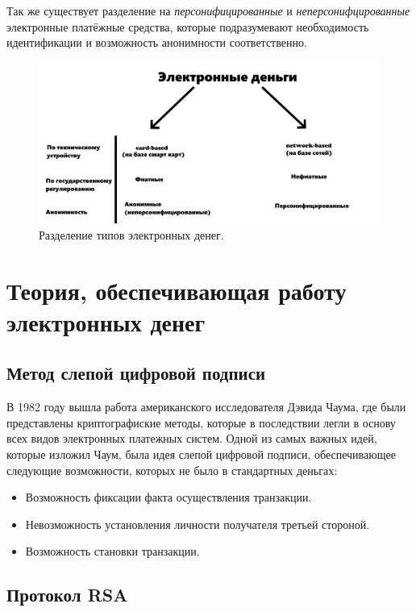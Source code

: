 \documentclass[12pt,a4paper]{article}
\begin{document}
Так же существует разделение на \textit{персонифицированные} и \textit{неперсонифцированные} электронные платёжные средства, которые подразумевают необходимость идентификации и возможность анонимности соответственно.

\begin{figure}[h]
    \centering
    \includegraphics[width=1\textwidth]{pic1}
    \caption{Разделение типов электронных денег.}
    \label{fig:mesh1}
\end{figure}

\section{Теория, обеспечивающая работу электронных денег}

\subsection{Метод слепой цифровой подписи}

В 1982 году вышла работа американского исследователя Дэвида Чаума, где были представлены криптографиские методы, которые в последствии легли в основу всех видов электронных платежных систем. Одной из самых важных идей, которые изложил Чаум, была идея слепой цифровой подписи, обеспечивающее следующие возможности, которых не было в стандартных деньгах:

\begin{itemize}
	\item Возможность фиксации факта осуществления транзакции.
	\item Невозможность установления личности получателя третьей стороной.
	\item Возможность становки транзакции.
\end{itemize}

\subsection{Протокол RSA}
\end{document}
